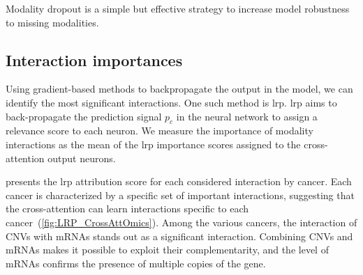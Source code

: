 \documentclass[../main.tex]{subfiles}
\begin{document}
	    Modality dropout is a simple but effective strategy to increase model robustness to missing modalities.

	\subsection{Interaction importances}
	    Using gradient-based methods to backpropagate the output in the model, we can identify the most significant interactions.
	    One such method is \gls{lrp}.
	    \Gls{lrp} aims to back-propagate the prediction signal \(p_c\) in the neural network to assign a relevance score to each neuron.
	    We measure the importance of modality interactions as the mean of the \gls{lrp} importance scores assigned to the cross-attention output neurons.

	     presents the \gls{lrp} attribution score for each considered interaction by cancer.
	    Each cancer is characterized by a specific set of important interactions, suggesting that the cross-attention can learn interactions specific to each cancer~(\cref{fig:LRP_CrossAttOmics}).
	    Among the various cancers, the interaction of CNVs with mRNAs stands out as a significant interaction.
	    Combining CNVs and mRNAs makes it possible to exploit their complementarity, and the level of mRNAs confirms the presence of multiple copies of the gene.
\end{document}
